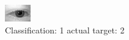 \begin{figure}[h!]
\begin{center}
\includegraphics[width=0.60\columnwidth]{figures/ID395_class_1_target_2.png}
\end{center}
\caption{ Classification: 1 actual target: 2}
\label{fig:ID395_class_1_target_2}
\end{figure}
